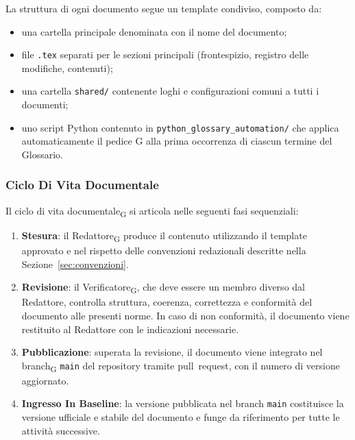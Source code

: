 La struttura di ogni documento segue un template condiviso, composto da:
 
\begin{itemize}
  \item una cartella principale denominata con il nome del documento;
  \item file \texttt{.tex} separati per le sezioni principali (frontespizio,
        registro delle modifiche, contenuti);
  \item una cartella \texttt{shared/} contenente loghi e configurazioni comuni
        a tutti i documenti;
  \item uno script Python contenuto in \texttt{python\_glossary\_automation/}
        che applica automaticamente il pedice G alla prima
        occorrenza di ciascun termine del Glossario.
\end{itemize}
 
\subsubsection{Ciclo Di Vita Documentale}
\label{sec:ciclo-vita}
 
Il ciclo di vita documentale\textsubscript{G} si articola nelle seguenti fasi sequenziali:
 
\begin{enumerate}
  \item \textbf{Stesura}: il Redattore\textsubscript{G} produce il contenuto
        utilizzando il template approvato e nel rispetto delle convenzioni
        redazionali descritte nella Sezione~\ref{sec:convenzioni}.
 
  \item \textbf{Revisione}: il Verificatore\textsubscript{G},
        che deve essere un membro diverso dal Redattore, controlla struttura,
        coerenza, correttezza e conformità del documento alle presenti norme.
        In caso di non conformità, il documento viene restituito al Redattore
        con le indicazioni necessarie.
 
  \item \textbf{Pubblicazione}: superata la revisione, il documento viene
        integrato nel branch\textsubscript{G} \texttt{main} del
        repository tramite pull~request,
        con il numero di versione aggiornato.
 
  \item \textbf{Ingresso In Baseline}: la versione pubblicata
        nel branch \texttt{main} costituisce la versione ufficiale e stabile del
        documento e funge da riferimento per tutte le attività successive.
\end{enumerate}
 
